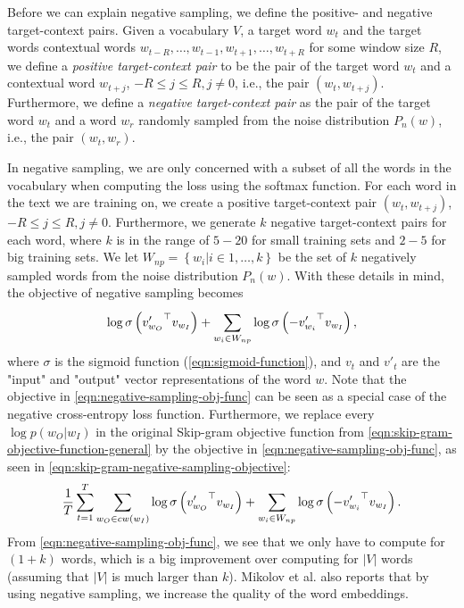 Before we can explain negative sampling, we define the positive- and negative target-context pairs. Given a vocabulary $V$, a target word $w_t$ and the target words contextual words $w_{t-R}, \ldots, w_{t-1}, w_{t+1}, \ldots, w_{t+R}$ for some window size $R$, we define a \textit{positive target-context pair} to be the pair of the target word $w_t$ and a contextual word $w_{t+j}$, $-R \leq j \leq R, j \neq 0$, i.e., the pair $\left( w_t, w_{t+j} \right)$. Furthermore, we define a \textit{negative target-context pair} as the pair of the target word $w_t$ and a word $w_r$ randomly sampled from the noise distribution $P_n(w)$, i.e., the pair $\left( w_t, w_r \right)$.

In negative sampling, we are only concerned with a subset of all the words in the vocabulary when computing the loss using the softmax function. For each word in the text we are training on, we create a positive target-context pair $\left( w_t, w_{t+j} \right)$, $-R \leq j \leq R, j \neq 0$. Furthermore, we generate $k$ negative target-context pairs for each word, where $k$ is in the range of $5-20$ for small training sets and $2-5$ for big training sets. We let $W_{np} = \left \{ w_i | i \in 1, \ldots, k \right \}$ be the set of $k$ negatively sampled words from the noise distribution $P_n(w)$. With these details in mind, the objective of negative sampling becomes \cite{mikolov2013b, rong2016word2vec}
\begin{align}
    \log \sigma \left( {v'_{w_O}}^\top v_{w_I} \right) + \sum\limits_{w_i \in W_{np}}^{} \log \sigma \left( -{v'_{w_i}}^\top v_{w_I} \right),
    \label{eqn:negative-sampling-obj-func}
\end{align}
where $\sigma$ is the sigmoid function (\cref{eqn:sigmoid-function}), and $v_t$ and $v'_t$ are the "input" and "output" vector representations of the word $w$. Note that the objective in \cref{eqn:negative-sampling-obj-func} can be seen as a special case of the negative cross-entropy loss function. Furthermore, we replace every $\log p(w_O | w_I)$ in the original Skip-gram objective function from \cref{eqn:skip-gram-objective-function-general} by the objective in \cref{eqn:negative-sampling-obj-func}, as seen in \cref{eqn:skip-gram-negative-sampling-objective}:
\begin{align}
    \frac{1}{T} \sum\limits_{t=1}^{T} \sum\limits_{w_O \in cw(w_I)}^{} \log \sigma \left( {v'_{w_O}}^\top v_{w_I} \right) + \sum\limits_{w_i \in W_{np}}^{} \log \sigma \left( -{v'_{w_i}}^\top v_{w_I} \right).
    \label{eqn:skip-gram-negative-sampling-objective}
\end{align}
From \cref{eqn:negative-sampling-obj-func}, we see that we only have to compute for $(1 + k)$ words, which is a big improvement over computing for $|V|$ words (assuming that $|V|$ is much larger than $k$). Mikolov et al. also reports that by using negative sampling, we increase the quality of the word embeddings.

